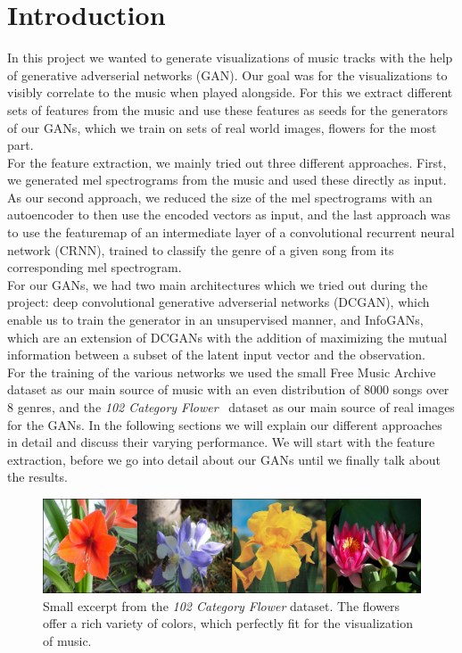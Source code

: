 \chapter{Introduction}
  In this project we wanted to generate visualizations of music tracks with the help of generative adverserial networks (GAN). 
  Our goal was for the visualizations to visibly correlate to the music when played alongside.
  For this we extract different sets of features from the music and use these features as seeds for the generators of our GANs, which we train on sets of real world images, flowers for the most part.\\
  For the feature extraction, we mainly tried out three different approaches. First, we generated mel spectrograms from the music and used these directly as input. 
  As our second approach, we reduced the size of the mel spectrograms with an autoencoder to then use the encoded vectors as input, and the last approach was to use the featuremap of an intermediate layer of a convolutional recurrent neural network (CRNN), trained to classify the genre of a given song from its corresponding mel spectrogram.\\
  For our GANs, we had two main architectures which we tried out during the project: deep convolutional generative adverserial networks (DCGAN), which enable us to train the generator in an unsupervised manner, and InfoGANs, which are an extension of DCGANs with the addition of maximizing
  the mutual information between a subset of the latent input vector and the observation.\\
  For the training of the various networks we used the small Free Music Archive~\cite{FMA} dataset as our main source of music with an even distribution of 8000 songs over 8 genres, and the \textit{102 Category Flower}~\cite{102flower} dataset as our main source of real images for the GANs.
  In the following sections we will explain our different approaches in detail and discuss their varying performance. We will start with the feature extraction, before we go into detail about our GANs until we finally talk about the results.

  \begin{figure}
    \centering
    \includegraphics[width=\textwidth]{images/real_samples}
    \caption{Small excerpt from the \textit{102 Category Flower} dataset. The flowers offer a rich variety of colors, which perfectly fit for the visualization of music.}
    \label{flowers}
  \end{figure}